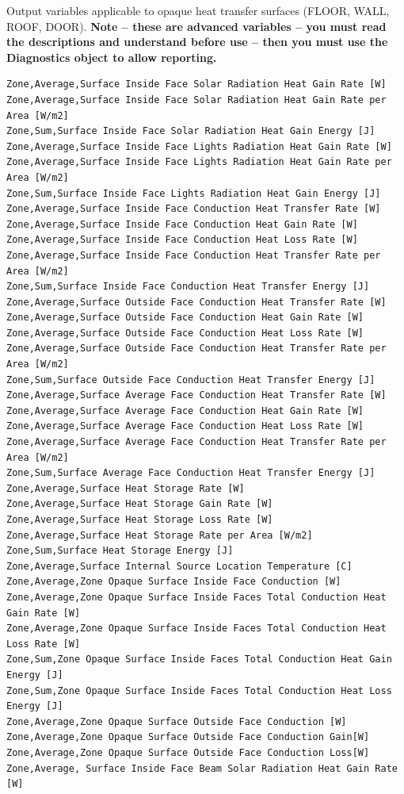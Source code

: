 Output variables applicable to opaque heat transfer surfaces (FLOOR, WALL, ROOF, DOOR). \textbf{Note -- these are advanced variables -- you must read the descriptions and understand before use -- then you must use the Diagnostics object to allow reporting.}

\begin{lstlisting}
Zone,Average,Surface Inside Face Solar Radiation Heat Gain Rate [W]
Zone,Average,Surface Inside Face Solar Radiation Heat Gain Rate per Area [W/m2]
Zone,Sum,Surface Inside Face Solar Radiation Heat Gain Energy [J]
Zone,Average,Surface Inside Face Lights Radiation Heat Gain Rate [W]
Zone,Average,Surface Inside Face Lights Radiation Heat Gain Rate per Area [W/m2]
Zone,Sum,Surface Inside Face Lights Radiation Heat Gain Energy [J]
Zone,Average,Surface Inside Face Conduction Heat Transfer Rate [W]
Zone,Average,Surface Inside Face Conduction Heat Gain Rate [W]
Zone,Average,Surface Inside Face Conduction Heat Loss Rate [W]
Zone,Average,Surface Inside Face Conduction Heat Transfer Rate per Area [W/m2]
Zone,Sum,Surface Inside Face Conduction Heat Transfer Energy [J]
Zone,Average,Surface Outside Face Conduction Heat Transfer Rate [W]
Zone,Average,Surface Outside Face Conduction Heat Gain Rate [W]
Zone,Average,Surface Outside Face Conduction Heat Loss Rate [W]
Zone,Average,Surface Outside Face Conduction Heat Transfer Rate per Area [W/m2]
Zone,Sum,Surface Outside Face Conduction Heat Transfer Energy [J]
Zone,Average,Surface Average Face Conduction Heat Transfer Rate [W]
Zone,Average,Surface Average Face Conduction Heat Gain Rate [W]
Zone,Average,Surface Average Face Conduction Heat Loss Rate [W]
Zone,Average,Surface Average Face Conduction Heat Transfer Rate per Area [W/m2]
Zone,Sum,Surface Average Face Conduction Heat Transfer Energy [J]
Zone,Average,Surface Heat Storage Rate [W]
Zone,Average,Surface Heat Storage Gain Rate [W]
Zone,Average,Surface Heat Storage Loss Rate [W]
Zone,Average,Surface Heat Storage Rate per Area [W/m2]
Zone,Sum,Surface Heat Storage Energy [J]
Zone,Average,Surface Internal Source Location Temperature [C]
Zone,Average,Zone Opaque Surface Inside Face Conduction [W]
Zone,Average,Zone Opaque Surface Inside Faces Total Conduction Heat Gain Rate [W]
Zone,Average,Zone Opaque Surface Inside Faces Total Conduction Heat Loss Rate [W]
Zone,Sum,Zone Opaque Surface Inside Faces Total Conduction Heat Gain Energy [J]
Zone,Sum,Zone Opaque Surface Inside Faces Total Conduction Heat Loss Energy [J]
Zone,Average,Zone Opaque Surface Outside Face Conduction [W]
Zone,Average,Zone Opaque Surface Outside Face Conduction Gain[W]
Zone,Average,Zone Opaque Surface Outside Face Conduction Loss[W]
Zone,Average, Surface Inside Face Beam Solar Radiation Heat Gain Rate [W]
\end{lstlisting}

